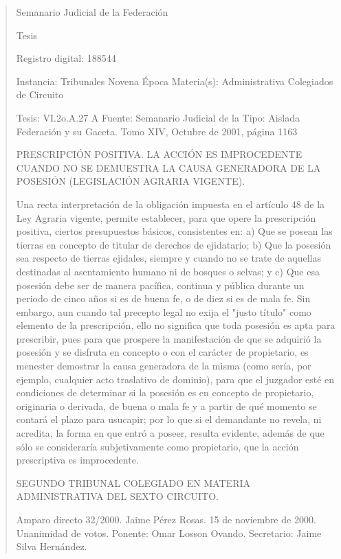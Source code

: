 \documentclass[11pt,a4paper]{article}
\begin{document}
\begin{quote}
                                                   Semanario Judicial de la Federación

                                                  Tesis

 Registro digital: 188544

 Instancia: Tribunales            Novena Época                         Materia(s): Administrativa
 Colegiados de Circuito

 Tesis: VI.2o.A.27 A              Fuente: Semanario Judicial de la  Tipo: Aislada
                                  Federación y su Gaceta.
                                  Tomo XIV, Octubre de 2001, página
                                  1163


PRESCRIPCIÓN POSITIVA. LA ACCIÓN ES IMPROCEDENTE CUANDO NO SE DEMUESTRA LA
CAUSA GENERADORA DE LA POSESIÓN (LEGISLACIÓN AGRARIA VIGENTE).


Una recta interpretación de la obligación impuesta en el artículo 48 de la Ley Agraria vigente,
permite establecer, para que opere la prescripción positiva, ciertos presupuestos básicos,
consistentes en: a) Que se posean las tierras en concepto de titular de derechos de ejidatario; b)
Que la posesión sea respecto de tierras ejidales, siempre y cuando no se trate de aquellas
destinadas al asentamiento humano ni de bosques o selvas; y c) Que esa posesión debe ser de
manera pacífica, continua y pública durante un periodo de cinco años si es de buena fe, o de diez si
es de mala fe. Sin embargo, aun cuando tal precepto legal no exija el "justo título" como elemento
de la prescripción, ello no significa que toda posesión es apta para prescribir, pues para que
prospere la manifestación de que se adquirió la posesión y se disfruta en concepto o con el carácter
de propietario, es menester demostrar la causa generadora de la misma (como sería, por ejemplo,
cualquier acto traslativo de dominio), para que el juzgador esté en condiciones de determinar si la
posesión es en concepto de propietario, originaria o derivada, de buena o mala fe y a partir de qué
momento se contará el plazo para usucapir; por lo que si el demandante no revela, ni acredita, la
forma en que entró a poseer, resulta evidente, además de que sólo se consideraría subjetivamente
como propietario, que la acción prescriptiva es improcedente.

SEGUNDO TRIBUNAL COLEGIADO EN MATERIA ADMINISTRATIVA DEL SEXTO CIRCUITO.


Amparo directo 32/2000. Jaime Pérez Rosas. 15 de noviembre de 2000. Unanimidad de votos.
Ponente: Omar Losson Ovando. Secretario: Jaime Silva Hernández.


\end{quote}
\end{document}

